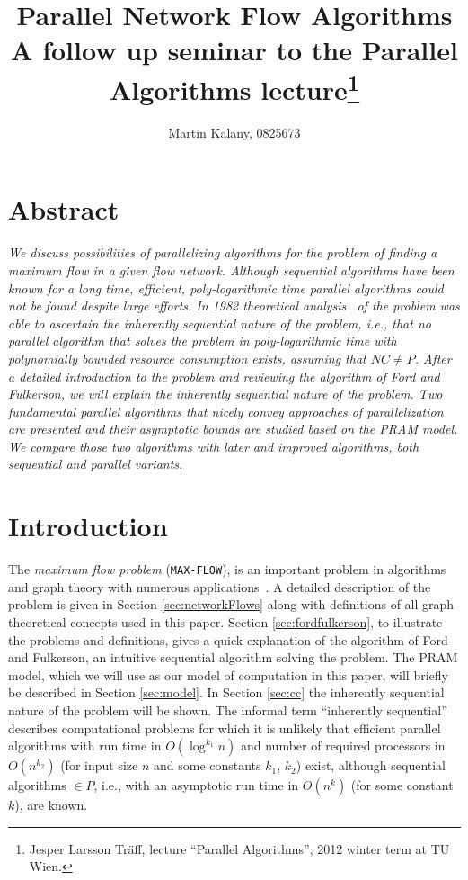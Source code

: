 \documentclass[a4paper,10pt, twocolumn]{article}
\title{Parallel Network Flow Algorithms \\ 
\large A follow up seminar to the Parallel Algorithms lecture\footnote{Jesper Larsson Träff, lecture ``Parallel Algorithms'', 2012 winter term at TU Wien.}}
\author{Martin Kalany, 0825673}
\begin{document}
\maketitle

\section{Abstract}
\label{sec:abstract}
\textit{We discuss possibilities of parallelizing algorithms for the problem of finding a maximum flow in a given flow network. Although sequential algorithms have been known for a long time, efficient, poly-logarithmic time parallel algorithms could not be found despite large efforts. In 1982 theoretical analysis~\cite{Goldschlager82} of the problem was able to ascertain the inherently sequential nature of the problem, i.e., that no parallel algorithm that solves the problem in poly-logarithmic time with polynomially bounded resource consumption exists, assuming that $NC \neq P$. After a detailed introduction to the problem and reviewing the algorithm of Ford and Fulkerson, we will explain the inherently sequential nature of the problem. Two fundamental parallel algorithms that nicely convey approaches of parallelization are presented and their asymptotic bounds are studied based on the PRAM model. We compare those two algorithms with later and improved algorithms, both sequential and parallel variants.}


\section{Introduction}
\label{sec:intro}
The \emph{maximum flow problem} (\lstinline|MAX-FLOW|), is an important problem in algorithms and graph theory with numerous applications~\cite{ahuja93}. A detailed description of the problem is given in Section \ref{sec:networkFlows} along with definitions of all graph theoretical concepts used in this paper. Section \ref{sec:fordfulkerson}, to illustrate the problems and definitions, gives a quick explanation of the algorithm of Ford and Fulkerson, an intuitive sequential algorithm solving the problem. The PRAM model, which we will use as our model of computation in this paper, will briefly be described in Section \ref{sec:model}. In Section \ref{sec:cc} the inherently sequential nature of the problem will be shown. The informal term ``inherently sequential'' describes computational problems for which it is unlikely that efficient parallel algorithms with run time in $O(\log^{k_1}n)$ and number of required processors in $O(n^{k_2})$ (for input size $n$ and some constants $k_1$, $k_2$) exist, although sequential algorithms $\in P$, i.e., with an asymptotic run time in $O(n^{k})$ (for some constant $k$), are known.
\end{document}
